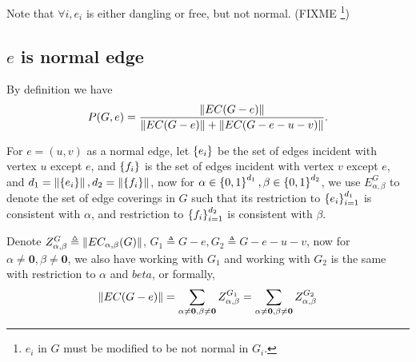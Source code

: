 %
%

Note that $\forall i, e_i$ is either dangling or free, but not normal. (FIXME \footnote{$e_i$ in $G$ must be modified to be not normal in $G_i$.})

\subsection{$e$ is normal edge}

By definition we have 
\begin{equation}
	P(G,e) = \frac{\left\Vert EC(G-e)\right\Vert}{\left\Vert EC(G-e)\right\Vert + \left\Vert EC(G-e-u-v)\right\Vert }.
\end{equation}


	For $e=(u,v)$ as a normal edge, let $\left\{e_i\right\}$ be the set of edges incident with vertex $u$ except $e$, and $\left\{f_i\right\}$ is the set of edges incident with vertex $v$ except $e$, and $d_1 = \left\Vert\left\{e_i\right\}\right\Vert, d_2 = \left\Vert\left\{f_i\right\}\right\Vert$, now for $\alpha \in \left\{0,1\right\}^{d_1}, \beta \in \left\{0,1\right\}^{d_2}$, we use $E_{\alpha,\beta}^G$ to denote the set of edge coverings in $G$ such that its restriction to $\left\{e_i\right\}_{i=1}^{d_1}$ is consistent with $\alpha$, and restriction to $\left\{f_i\right\}_{i=1}^{d_2}$ is consistent with $\beta$.

	Denote $Z_{\alpha, \beta}^G \triangleq \left\Vert EC_{\alpha, \beta}(G)\right\Vert$, $G_1 \triangleq G-e, G_2 \triangleq G-e-u-v$, %
	now for $\alpha \neq \mathbf{0} , \beta \neq \mathbf{0}$, we also have working with $G_1$ and working with $G_2$ is the same with restriction to $\alpha$ and $beta$, or formally,
\[\left\Vert EC(G-e)\right\Vert = \sum_{\alpha \neq \mathbf{0}, \beta \neq \mathbf{0}} Z_{\alpha, \beta}^{G_1} = \sum_{\alpha \neq \mathbf{0}, \beta \neq \mathbf{0}} Z_{\alpha, \beta}^{G_2}\]

